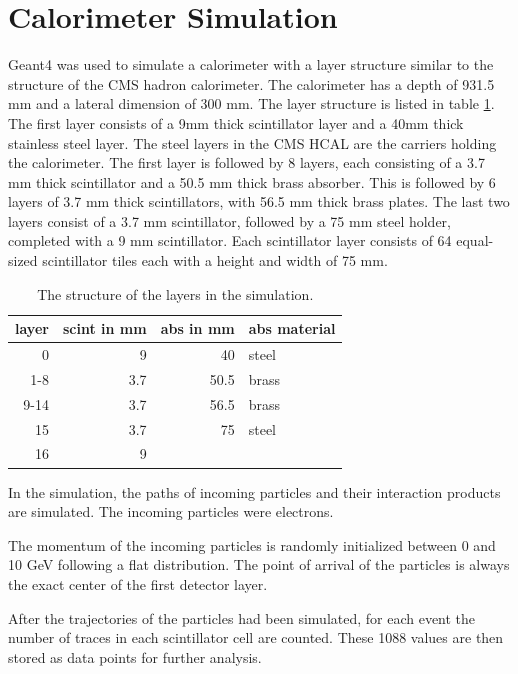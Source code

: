\documentclass[12pt, a4paper]{thesis}
\begin{document}
\section{Calorimeter Simulation}
\label{sec:org905cdeb}

Geant4 \cite{geant_simul_toolk} was used to simulate a calorimeter
with a layer structure similar to the structure of the CMS hadron
calorimeter. The calorimeter has a depth of 931.5 mm and a lateral
dimension of 300 mm. The layer structure is listed in table
\ref{fcn_structure}. The first layer consists of a 9mm thick
scintillator layer and a 40mm thick stainless steel layer. The steel
layers in the CMS HCAL are the carriers holding the calorimeter. The
first layer is followed by 8 layers, each consisting of a 3.7 mm thick
scintillator and a 50.5 mm thick brass absorber. This is followed by 6
layers of 3.7 mm thick scintillators, with 56.5 mm thick brass plates.
The last two layers consist of a 3.7 mm scintillator, followed by a 75
mm steel holder, completed with a 9 mm scintillator. Each scintillator
layer consists of 64 equal-sized scintillator tiles each with a height
and width of 75 mm.

\begin{table}[htbp]
  \centering
  \begin{tabular}{rrrl}
    layer & scint in mm & abs in mm & abs material\\
    \hline
    0 & 9 & 40 & steel\\
    1-8 & 3.7 & 50.5 & brass\\
    9-14 & 3.7 & 56.5 & brass\\
    15 & 3.7 & 75 & steel\\
    16 & 9 &  & \\
  \end{tabular}
  \caption{The structure of the layers in the simulation.}
  \label{fcn_structure}
\end{table}

In the simulation, the paths of incoming particles and their
interaction products are simulated. The incoming particles were
electrons.

The momentum of the incoming particles is randomly initialized between
0 and 10 GeV following a flat distribution. The point of arrival of
the particles is always the exact center of the first detector layer.

After the trajectories of the particles had been simulated, for each
event the number of traces in each scintillator cell are counted.
These 1088 values are then stored as data points for further analysis.
\end{document}

